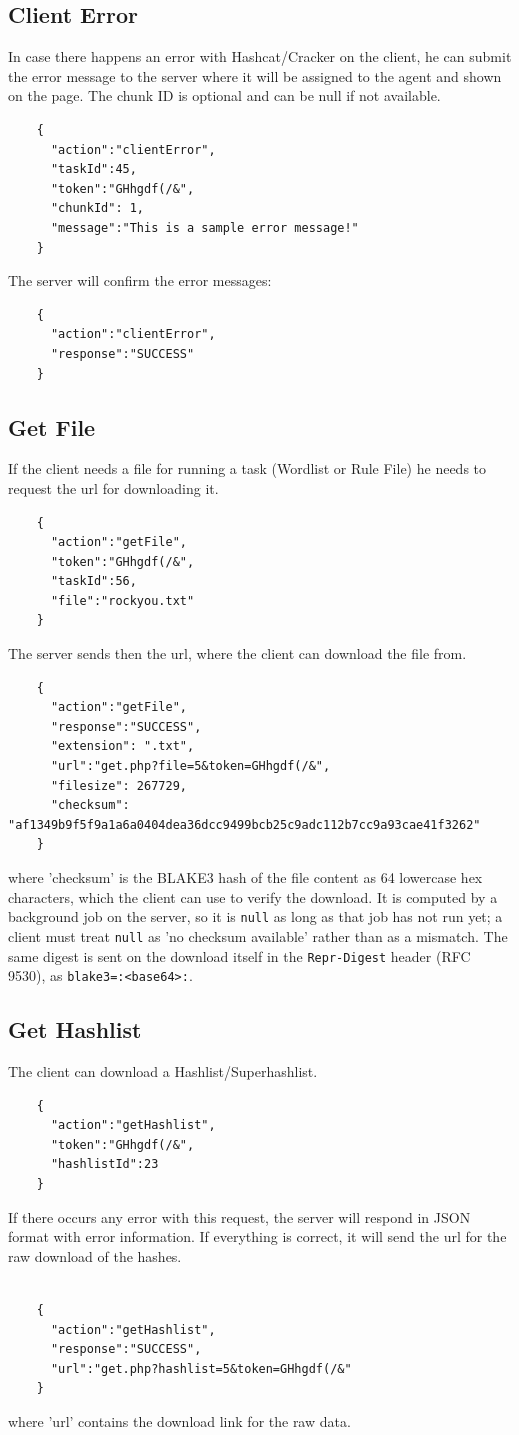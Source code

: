\documentclass{article}
\begin{document}
	\subsection*{Client Error}
	In case there happens an error with Hashcat/Cracker on the client, he can submit the error message to the server where it will be assigned to the agent and shown on the page. The chunk ID is optional and can be null if not available.
	\begin{verbatim}
	{
	  "action":"clientError",
	  "taskId":45,
	  "token":"GHhgdf(/&",
	  "chunkId": 1,
	  "message":"This is a sample error message!"
	}
	\end{verbatim}
	The server will confirm the error messages:
	\begin{verbatim}
	{
	  "action":"clientError",
	  "response":"SUCCESS"
	}
	\end{verbatim}
	
	\subsection*{Get File}
	If the client needs a file for running a task (Wordlist or Rule File) he needs to request the url for downloading it.
	\begin{verbatim}
	{
	  "action":"getFile",
	  "token":"GHhgdf(/&",
	  "taskId":56,
	  "file":"rockyou.txt"
	}
	\end{verbatim}
	The server sends then the url, where the client can download the file from.
	\begin{verbatim}
	{
	  "action":"getFile",
	  "response":"SUCCESS",
	  "extension": ".txt",
	  "url":"get.php?file=5&token=GHhgdf(/&",
	  "filesize": 267729,
	  "checksum": "af1349b9f5f9a1a6a0404dea36dcc9499bcb25c9adc112b7cc9a93cae41f3262"
	}
	\end{verbatim}
	where 'checksum' is the BLAKE3 hash of the file content as 64 lowercase hex characters, which the
	client can use to verify the download. It is computed by a background job on the server, so it is
	\texttt{null} as long as that job has not run yet; a client must treat \texttt{null} as 'no
	checksum available' rather than as a mismatch. The same digest is sent on the download itself in
	the \texttt{Repr-Digest} header (RFC 9530), as \texttt{blake3=:<base64>:}.

	\subsection*{Get Hashlist}
	The client can download a Hashlist/Superhashlist.
	\begin{verbatim}
	{
	  "action":"getHashlist",
	  "token":"GHhgdf(/&",
	  "hashlistId":23
	}
	\end{verbatim}
	If there occurs any error with this request, the server will respond in JSON format with error information. If everything is correct, it will send the url for the raw download of the hashes.\\\\
	\begin{verbatim}
	{
	  "action":"getHashlist",
	  "response":"SUCCESS",
	  "url":"get.php?hashlist=5&token=GHhgdf(/&"
	}
	\end{verbatim}
	where 'url' contains the download link for the raw data.
	
\end{document}
